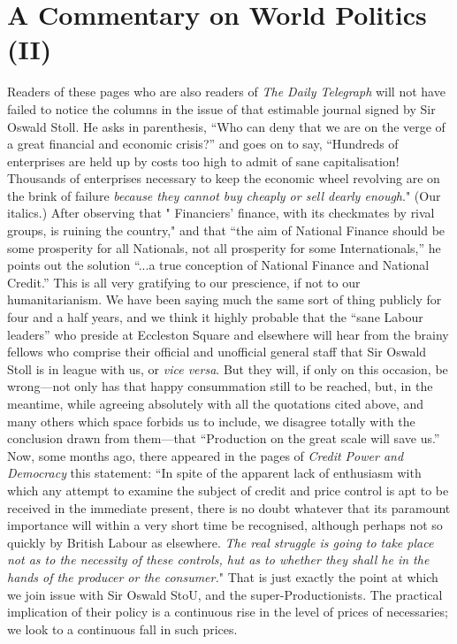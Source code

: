 \documentclass{book}
\begin{document}
\chapter{A Commentary on World Politics (II)}
\label{chapter-10}
Readers of these pages who are also readers of \emph{The Daily Telegraph} will not have failed to notice the columns in the issue of that estimable journal signed by Sir Oswald Stoll. He asks in parenthesis, “Who can deny that we are on the verge of a great financial and economic crisis?” and goes on to say, “Hundreds of enterprises are held up by costs too high to admit of sane capitalisation! Thousands of enterprises necessary to keep the economic wheel revolving are on the brink of failure \emph{because they cannot buy cheaply or sell dearly enough}." (Our italics.) After observing that " Financiers’ finance, with its checkmates by rival groups, is ruining the country," and that “the aim of National Finance should be some prosperity for all Nationals, not all prosperity for some Internationals,” he points out the solution “...a true conception of National Finance and National Credit.” This is all very gratifying to our prescience, if not to our humanitarianism. We have been saying much the same sort of thing publicly for four and a half years, and we think it highly probable that the “sane Labour leaders” who preside at Eccleston Square and elsewhere will hear from the brainy fellows who comprise their official and unofficial general staff that Sir Oswald Stoll is in league with us, or \emph{vice versa}. But they will, if only on this occasion, be wrong—not only has that happy consummation still to be reached, but, in the meantime, while agreeing absolutely with all the quotations cited above, and many others which space forbids us to include, we disagree totally with the conclusion drawn from them—that “Production on the great scale will save us.” Now, some months ago, there appeared in the pages of \emph{Credit Power and Democracy} this statement: “In spite of the apparent lack of enthusiasm with which any attempt to examine the subject of credit and price control is apt to be received in the immediate present, there is no doubt whatever that its paramount importance will within a very short time be recognised, although perhaps not so quickly by British Labour as elsewhere. \emph{The real struggle is going to take place not as to the necessity of these controls, hut as to whether they shall he in the hands of the producer or the consumer.}" That is just exactly the point at which we join issue with Sir Oswald StoU, and the super-Productionists. The practical implication of their policy is a continuous rise in the level of prices of necessaries; we look to a continuous fall in such prices.
\end{document}
